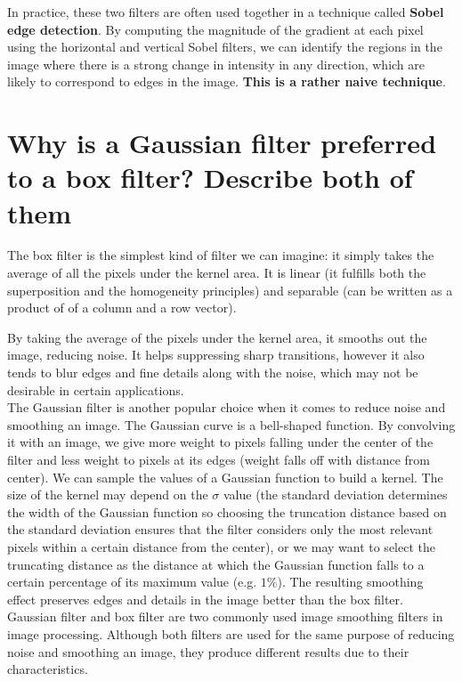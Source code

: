 \documentclass{article}
\begin{document}
In practice, these two filters are often used together in a technique called \textbf{Sobel edge detection}. By computing the magnitude of the gradient at each pixel using the horizontal and vertical Sobel filters, we can identify the regions in the image where there is a strong change in intensity in any direction, which are likely to correspond to edges in the image. \textbf{This is a rather naive technique}.

\newpage

\section{Why is a Gaussian filter preferred to a box filter? Describe both of them}

The box filter is the simplest kind of filter we can imagine: it simply takes the average of all the pixels under the kernel area. It is linear (it fulfills both the superposition and the homogeneity principles) and separable (can be written as a product of of a column and a row vector). 

By taking the average of the pixels under the kernel area, it smooths out the image, reducing noise. It helps suppressing sharp transitions, however it also tends to blur edges and fine details along with the noise, which may not be desirable in certain applications. \\

The Gaussian filter is another popular choice when it comes to reduce noise and smoothing an image. The Gaussian curve is a bell-shaped function. By convolving it with an image, we give more weight to pixels falling under the center of the filter and less weight to pixels at its edges (weight falls off with distance from center). We can sample the values of a Gaussian function to build a kernel. The size of the kernel may depend on the $\sigma$ value (the standard deviation determines the width of the Gaussian function so choosing the truncation distance based on the standard deviation ensures that the filter considers only the most relevant pixels within a certain distance from the center), or we may want to select the truncating distance as the distance at which the Gaussian function falls to a certain percentage of its maximum value (e.g. $1\%$). The resulting smoothing effect preserves edges and details in the image better than the box filter. \\

Gaussian filter and box filter are two commonly used image smoothing filters in image processing. Although both filters are used for the same purpose of reducing noise and smoothing an image, they produce different results due to their characteristics. \\
\end{document}

